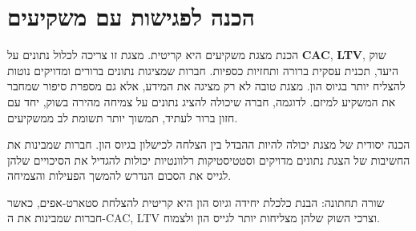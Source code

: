 \section{הכנה לפגישות עם משקיעים}
הכנת מצגת משקיעים  היא קריטית. מצגת זו צריכה לכלול נתונים על \textbf{CAC}, \textbf{LTV}, שוק היעד, תכנית עסקית ברורה ותחזיות כספיות. חברות שמציגות נתונים ברורים ומדויקים נוטות להצליח יותר בגיוס הון. מצגת טובה לא רק מציגה את המידע, אלא גם מספרת סיפור שמחבר את המשקיע למיזם. לדוגמה, חברה שיכולה להציג נתונים על צמיחה מהירה בשוק, יחד עם חזון ברור לעתיד, תמשוך יותר תשומת לב ממשקיעים.

הכנה יסודית של מצגת יכולה להיות ההבדל בין הצלחה לכישלון בגיוס הון. חברות שמבינות את החשיבות של הצגת נתונים מדויקים וסטטיסטיקות רלוונטיות יכולות להגדיל את הסיכויים שלהן לגייס את הסכום הנדרש להמשך הפעילות והצמיחה.

\begin{takeaway}
שורה תחתונה: הבנת כלכלת יחידה וגיוס הון היא קריטית להצלחת סטארט-אפים, כאשר חברות שמבינות את ה-CAC, LTV וצרכי השוק שלהן מצליחות יותר לגייס הון ולצמוח.
\end{takeaway}
